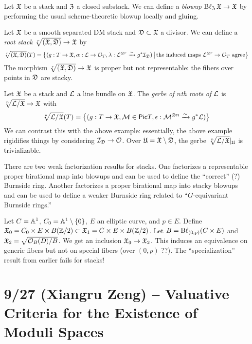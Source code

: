 \documentclass{amsart}
\begin{document}
\begin{ex}
	Let $\Xfr$ be a stack and $\Zfr$ a closed substack.
	We can define a \emph{blowup} $\Bl_\Zfr \Xfr \to \Xfr$ by performing the usual scheme-theoretic blowup locally and gluing.
\end{ex}

\begin{ex}
	Let $\Xfr$ be a smooth separated DM stack and $\Dfr \subset \Xfr$ a divisor.
	We can define a \emph{root stack} $\sqrt[r]{(\Xfr, \Dfr)} \to \Xfr$ by
	\[
		\sqrt[r]{(\Xfr, \Dfr)}(T) = \big\{ (g: T \to \Xfr, \alpha: \Lc \to \Oc_T, \lambda: \Lc^{\otimes r} \xrightarrow{\sim} g^* \Ic_{\Dfr} ) \,\big|\, \textrm{the induced maps $\Lc^{\otimes r} \to \Oc_T$ agree}\big\}
	\]
	The morphism $\sqrt[r]{(\Xfr, \Dfr)} \to \Xfr$ is proper but not representable: the fibers over points in $\Dfr$ are stacky.
\end{ex}

\begin{ex}
	Let $\Xfr$ be a stack and $\Lc$ a line bundle on $\Xfr$.
	The \emph{gerbe of $n$th roots of $\Lc$} is $\sqrt[n]{\Lc / \Xfr} \to \Xfr$ with
	\[
		\sqrt[n]{\Lc / \Xfr}(T) = \big\{ (g: T \to \Xfr, \Mc \in \Pic T, \epsilon: \Mc^{\otimes n} \xrightarrow{\sim} g^* \Lc) \big\}
	\]
	We can contrast this with the above example: essentially, the above example rigidifies things by considering $\Ic_\Dfr \to \Oc$.
	Over $\Ufr = \Xfr \setminus \Dfr$, the gerbe $\sqrt[n]{\Lc / \Xfr}|_{\Ufr}$ is trivializable.
\end{ex}

There are two weak factorization results for stacks.
One factorizes a representable proper birational map into blowups and can be used to define the ``correct'' (?) Burnside ring.
Another factorizes a proper birational map into stacky blowups and can be used to define a weaker Burnside ring related to ``$G$-equivariant Burnside rings.''

\begin{ex}
	Let $C = \AA^1$, $C_0 = \AA^1 \setminus \{0\}$, $E$ an elliptic curve, and $p \in E$.
	Define $\Xfr_0 = C_0 \times E \times B(\ZZ / 2) \subset \Xfr_1 = C \times E \times B(\ZZ / 2)$.
	Let $B = \Bl_{(0,p)} (C \times E)$ and $\Xfr_2 = \sqrt{\Oc_B(D)/B}$.
	We get an inclusion $\Xfr_0 \to \Xfr_2$.
	This induces an equivalence on generic fibers but not on special fibers (over $(0, p)$ ??).
	The ``specialization'' result from earlier fails for stacks!
\end{ex}

\section{9/27 (Xiangru Zeng) -- Valuative Criteria for the Existence of Moduli Spaces}
\end{document}
